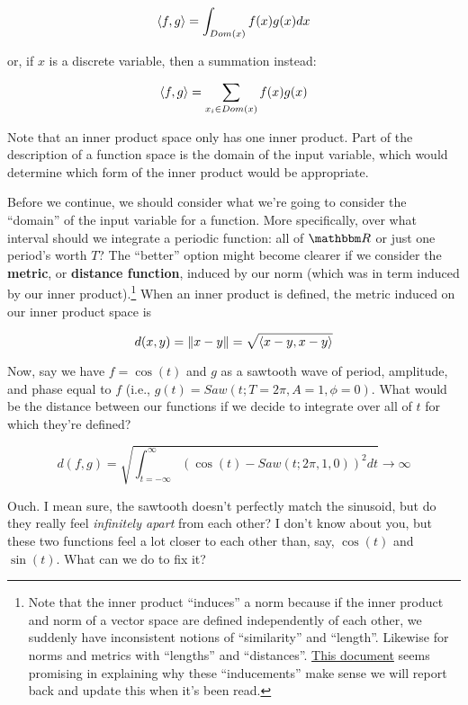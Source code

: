 \documentclass[letterpaper,12pt]{report}
\begin{document}
\[\innerprod[f][g] = \int_{Dom(x)} f(x)g(x) dx \]

or, if \(x\) is a discrete variable, then a summation instead:

\[\innerprod[f][g] = \sum_{x_i \in Dom(x)} f(x)g(x) \]

Note that an inner product space only has one inner product.
Part of the description of a function space is the domain 
of the input variable, which would determine which form
of the inner product would be appropriate.\par

Before we continue, we should consider what we're going to
consider the ``domain'' of the input variable for a function.
More specifically, over what interval should we integrate
a periodic function: all of \(\domain{R}\) or just one period's
worth \(T\)?
The ``better'' option might become clearer if we consider
the \textbf{metric}, or \textbf{distance function},
induced by our norm (which was in term induced by our
inner product).\footnote{
  Note that the inner product ``induces'' a norm
  because if the inner product and norm of a vector space
  are defined independently of each other,
  we suddenly have inconsistent notions of ``similarity''
  and ``length''. Likewise for norms and metrics
  with ``lengths'' and ``distances''.
  \href{http://people.math.gatech.edu/~heil/books/metricbrief.pdf}{This document}
  seems promising in explaining why these ``inducements''
  make sense \textemdash{} we will report back and
  update this when it's been read.
}
When an inner product is defined, the metric 
induced on our inner product space is

\[d(x,y) = \norm[x-y] = \sqrt{\innerprod[x-y][x-y]} \]

Now, say we have \(f = \cos(t)\) and \(g\) as a sawtooth
wave of period, amplitude, and phase equal to \(f\)
(i.e., \(g(t) = Saw(t; T = 2\pi, A = 1, \phi = 0)\).
What would be the distance between our functions if
we decide to integrate over all of \(t\) for which
they're defined?

\[d(f,g) = \sqrt{\int_{t = -\infty}^{\infty} \left(\cos(t) - Saw(t; 2\pi, 1, 0)\right)^2 dt} \rightarrow \infty \]

Ouch. I mean sure, the sawtooth doesn't perfectly match
the sinusoid, but do they really feel \emph{infinitely apart}
from each other? I don't know about you, but these two
functions feel a lot closer to each other than, say,
\(\cos(t)\) and \(\sin(t)\). What can we do to fix it?\par
\end{document}

